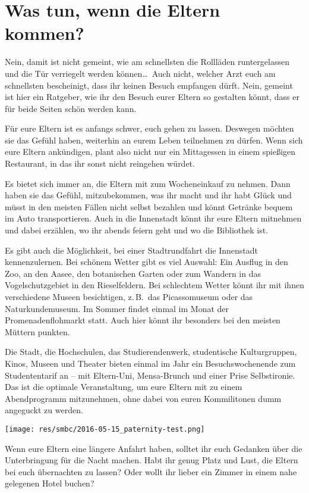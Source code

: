 \section{Was tun, wenn die Eltern kommen?}
\begin{multicols}{2}
Nein, damit ist nicht gemeint, wie am schnellsten die Rollläden runtergelassen und die Tür verriegelt werden können\dots\
Auch nicht, welcher Arzt euch am schnellsten bescheinigt, dass ihr keinen Besuch empfangen dürft.
Nein, gemeint ist hier ein Ratgeber, wie ihr den Besuch eurer Eltern so gestalten könnt, dass er für beide Seiten schön werden kann.

\begin{center}
\end{center}

Für eure Eltern ist es anfangs schwer, euch gehen zu lassen.
Deswegen möchten sie das Gefühl haben, weiterhin an eurem Leben teilnehmen zu dürfen.
Wenn sich eure Eltern ankündigen, plant also nicht nur ein Mittagessen in einem spießigen Restaurant, in das ihr sonst nicht reingehen würdet.

Es bietet sich immer an, die Eltern mit zum Wocheneinkauf zu nehmen.
Dann haben sie das Gefühl, mitzubekommen, was ihr macht und ihr habt Glück und müsst in den meisten Fällen nicht selbst bezahlen und könnt Getränke bequem im Auto transportieren.
Auch in die Innenstadt könnt ihr eure Eltern mitnehmen und dabei erzählen, wo ihr abends feiern geht und wo die Bibliothek ist.

Es gibt auch die Möglichkeit, bei einer Stadtrundfahrt die Innenstadt kennenzulernen.
Bei schönem Wetter gibt es viel Auswahl: Ein Ausflug in den Zoo, an den Aasee, den botanischen Garten oder zum Wandern in das Vogelschutzgebiet in den Rieselfeldern.
Bei schlechtem Wetter könnt ihr mit ihnen verschiedene Museen besichtigen, z.\,B.\ das Picassomuseum oder das Naturkundemuseum.
Im Sommer findet einmal im Monat der Promenadenflohmarkt statt.
Auch hier könnt ihr besonders bei den meisten Müttern punkten.

Die Stadt, die Hochschulen, das Studierendenwerk, studentische Kulturgruppen, Kinos, Museen und Theater bieten einmal im Jahr ein Besuchswochenende zum Studententarif an – mit Eltern-Uni, Mensa-Brunch und einer Prise Selbstironie.
Das ist die optimale Veranstaltung, um eure Eltern mit zu einem Abendprogramm mitzunehmen, ohne dabei von euren Kommilitonen dumm angeguckt zu werden.

\begin{center}
	\texttt{[image: res/smbc/2016-05-15\_paternity-test.png]}
\end{center}

Wenn eure Eltern eine längere Anfahrt haben, solltet ihr euch Gedanken über die Unterbringung für die Nacht machen.
Habt ihr genug Platz und Lust, die Eltern bei euch übernachten zu lassen? Oder wollt ihr lieber ein Zimmer in einem nahe gelegenen Hotel buchen?

\end{multicols}

\begin{center}
\end{center}


